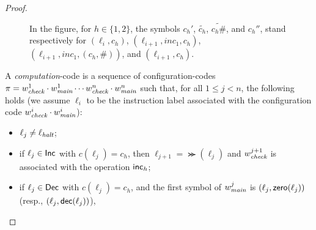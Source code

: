 \begin{proof}
\begin{figure}
{%
%
%    
In the figure, for $h\in\{1,2\}$, the symbols $c_h'$, $\tilde{c_h}$, $\widetilde{c_h\#}$, and $c_h''$, stand respectively for $(\ell_i ,c_h)$, $(\ell_{i+1},inc_1,c_h)$, $(\ell_{i+1},inc_1,(c_h,\#))$, and $(\ell_{i+1} ,c_h)$.
    }
    \label{fig:counters}
\end{figure}
A \emph{computation}-code is a %
sequence of configuration-codes $\pi= w_{{\textit{check}}}^{1}\cdot w_{\textit{main}}^{1}\cdots\allowbreak  w_{{\textit{check}}}^{n}\cdot w_{\textit{main}}^{n}$ such that, for all $1\leq j<n$, the following holds (we assume $\ell_i$ to be the instruction label associated with the configuration code $w_{{\textit{check}}}^{i}\cdot w_{\textit{main}}^{i}$):
%
\begin{itemize}
  \item $\ell_j\neq \ell_{\textit{halt}}$;
  \item if $\ell_j\in\mathsf{Inc}$ with $c(\ell_j)=c_h$, then $\ell_{j+1}=\Succ(\ell_j)$ and  $w_{{\textit{check}}}^{j+1}$ is associated with the operation
  ${\mathsf{inc}}_h$;
  \item if $\ell_j\in\mathsf{Dec}$ with $c(\ell_j)=c_h$, and the first symbol of $w_{\textit{main}}^{j}$ is $(\ell_j,{\mathsf{zero}}(\ell_j))$ (resp., $(\ell_j,{\mathsf{dec}}(\ell_j))$),

\end{itemize}
\end{proof}
